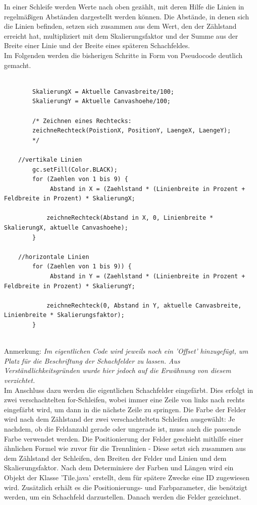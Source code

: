 \documentclass[12pt,a4paper]{article}
\begin{document}
In einer Schleife werden Werte nach oben gezählt, mit deren Hilfe die Linien in regelmäßigen Abständen dargestellt werden können. Die Abstände, in denen sich die Linien befinden, setzen sich zusammen aus dem Wert, den der Zählstand erreicht hat, multipliziert mit dem Skalierungsfaktor und der Summe aus der Breite einer Linie und der Breite eines späteren Schachfeldes.\\
Im Folgenden werden die bisherigen Schritte in Form von Pseudocode deutlich gemacht.\\
\lstset{language=java}
\begin{lstlisting}

		SkalierungX = Aktuelle Canvasbreite/100;
		SkalierungY = Aktuelle Canvashoehe/100;
		
		/* Zeichnen eines Rechtecks: 
		zeichneRechteck(PoistionX, PositionY, LaengeX, LaengeY);
		*/
	
	//vertikale Linien
		gc.setFill(Color.BLACK);
		for (Zaehlen von 1 bis 9) {
			 Abstand in X = (Zaehlstand * (Linienbreite in Prozent + Feldbreite in Prozent) * SkalierungX;
			 
			zeichneRechteck(Abstand in X, 0, Linienbreite * SkalierungX, aktuelle Canvashoehe);
		}

	//horizontale Linien		
		for (Zaehlen von 1 bis 9)) {
			 Abstand in Y = (Zaehlstand * (Linienbreite in Prozent + Feldbreite in Prozent) * SkalierungY;
			 
			zeichneRechteck(0, Abstand in Y, aktuelle Canvasbreite, Linienbreite * Skalierungsfaktor);
		}
		
\end{lstlisting}
Anmerkung: \textit{Im eigentlichen Code wird jeweils noch ein 'Offset' hinzugefügt, um Platz für die Beschriftung der Schachfelder zu lassen. Aus Verständlichkeitsgründen wurde hier jedoch auf die Erwähnung von diesem verzichtet.} \\[2ex]
Im Anschluss dazu werden die eigentlichen Schachfelder eingefärbt. Dies erfolgt in zwei verschachtelten for-Schleifen, wobei immer eine Zeile von links nach rechts eingefärbt wird, um dann in die nächste Zeile zu springen. Die Farbe der Felder wird nach dem Zählstand der zwei verschachteltetn Schleifen ausgewählt: Je nachdem, ob die Feldanzahl gerade oder ungerade ist, muss auch die passende Farbe verwendet werden. Die Positionierung der Felder geschieht mithilfe einer ähnlichen Formel wie zuvor für die Trennlinien - Diese setzt sich zusammen aus dem Zählstand der Schleifen, den Breiten der Felder und Linien und dem Skalierungsfaktor. Nach dem Determiniere der Farben und Längen wird ein Objekt der Klasse 'Tile.java' erstellt, dem für spätere Zwecke eine ID zugewiesen wird. Zusätzlich erhält es die Positionierungs- und Farbparameter, die benötzigt werden, um ein Schachfeld darzustellen. Danach werden die Felder gezeichnet. 
\end{document}
